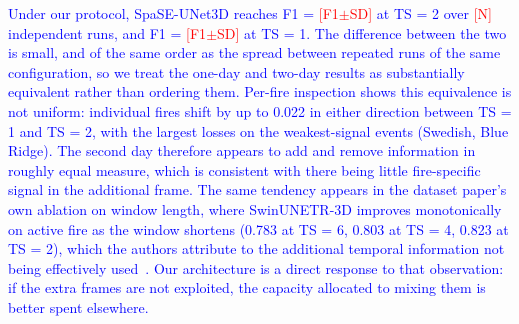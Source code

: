 \documentclass[sensors,article,submit,moreauthors,pdftex]{Definitions/mdpi}
\newcommand{\rev}[1]{\textcolor{blue}{#1}}
\newcommand{\nseedAF}{\textcolor{red}{[N]}}
\newcommand{\afTStwo}{\textcolor{red}{[F1$\pm$SD]}}
\newcommand{\afTSone}{\textcolor{red}{[F1$\pm$SD]}}
\begin{document}
\rev{Under our protocol, SpaSE-UNet3D reaches F1 = \afTStwo{} at TS = 2 over
\nseedAF{} independent runs, and F1 = \afTSone{} at TS = 1. The difference
between the two is small, and of the same order as the spread between repeated
runs of the same configuration, so we treat the one-day and two-day results as
substantially equivalent rather than ordering them. Per-fire inspection shows
this equivalence is not uniform: individual fires shift by up to 0.022 in either
direction between TS = 1 and TS = 2, with the largest losses on the
weakest-signal events (Swedish, Blue Ridge). The second day therefore appears to
add and remove information in roughly equal measure, which is consistent with
there being little fire-specific signal in the additional frame. The same
tendency appears in the dataset paper's own ablation on window length, where
SwinUNETR-3D improves monotonically on active fire as the window shortens
(0.783 at TS = 6, 0.803 at TS = 4, 0.823 at TS = 2), which the authors attribute
to the additional temporal information not being effectively
used~\cite{zhao2025tssatfire}. Our architecture is a direct response to that
observation: if the extra frames are not exploited, the capacity allocated to
mixing them is better spent elsewhere.}
\end{document}
